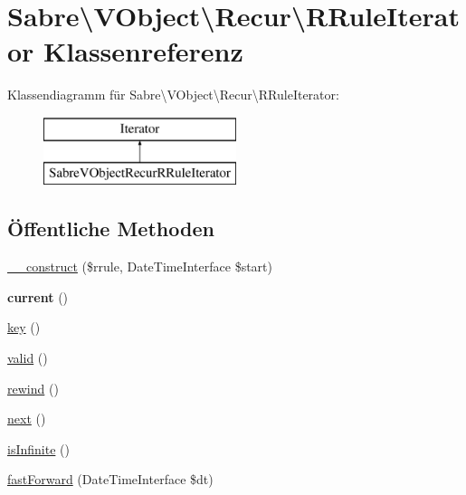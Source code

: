 \hypertarget{class_sabre_1_1_v_object_1_1_recur_1_1_r_rule_iterator}{}\section{Sabre\textbackslash{}V\+Object\textbackslash{}Recur\textbackslash{}R\+Rule\+Iterator Klassenreferenz}
\label{class_sabre_1_1_v_object_1_1_recur_1_1_r_rule_iterator}
Klassendiagramm für Sabre\textbackslash{}V\+Object\textbackslash{}Recur\textbackslash{}R\+Rule\+Iterator\+:\begin{figure}[H]
\begin{center}
\leavevmode
\includegraphics[height=2.000000cm]{class_sabre_1_1_v_object_1_1_recur_1_1_r_rule_iterator}
\end{center}
\end{figure}
\subsection*{Öffentliche Methoden}
\begin{DoxyCompactItemize}
\item 
\mbox{\hyperlink{class_sabre_1_1_v_object_1_1_recur_1_1_r_rule_iterator_a70d03748f1a4391cf3accc5005287c0b}{\+\_\+\+\_\+construct}} (\$rrule, Date\+Time\+Interface \$start)
\item 
\mbox{\label{class_sabre_1_1_v_object_1_1_recur_1_1_r_rule_iterator_afe5e4023881c019296faa5ce4dc70af8}} 
{\bfseries current} ()
\item 
\mbox{\hyperlink{class_sabre_1_1_v_object_1_1_recur_1_1_r_rule_iterator_a11e3b5b49921dd5a8b1840bf0f5fe1b5}{key}} ()
\item 
\mbox{\hyperlink{class_sabre_1_1_v_object_1_1_recur_1_1_r_rule_iterator_aa22d459f9a434244a62cd0e7cd42fc79}{valid}} ()
\item 
\mbox{\hyperlink{class_sabre_1_1_v_object_1_1_recur_1_1_r_rule_iterator_afe556e7068d776ddc1bdd7f033e0e98a}{rewind}} ()
\item 
\mbox{\hyperlink{class_sabre_1_1_v_object_1_1_recur_1_1_r_rule_iterator_a4d03f5258077464b461af5668ea46006}{next}} ()
\item 
\mbox{\hyperlink{class_sabre_1_1_v_object_1_1_recur_1_1_r_rule_iterator_a54c820d38ed626726f4102fd20aba775}{is\+Infinite}} ()
\item 
\mbox{\hyperlink{class_sabre_1_1_v_object_1_1_recur_1_1_r_rule_iterator_a6db4203b9a17a8c29483cb9435b766d6}{fast\+Forward}} (Date\+Time\+Interface \$dt)
\end{DoxyCompactItemize}
